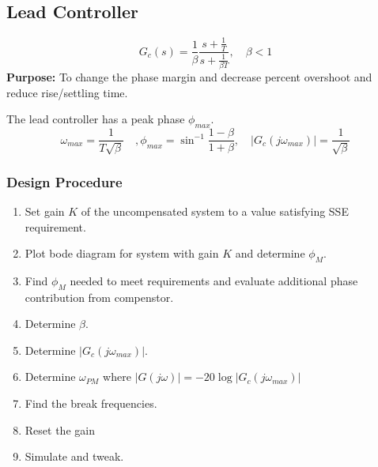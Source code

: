 \subsection*{Lead Controller}
\[
  G_c(s) = \frac{1}{\beta}\frac{s+\frac{1}{T}}{s+\frac{1}{\beta T}}, \quad \beta < 1
\]
\textbf{Purpose:} To change the phase margin and decrease percent overshoot and reduce rise/settling time.

The lead controller has a peak phase $\phi_{max}$.
\[
  \omega_{max} = \frac{1}{T\sqrt{\beta}}\quad, \phi_{max} = \sin^{-1}\frac{1-\beta}{1+\beta}, \quad |G_c(j\omega_{max})| = \frac{1}{\sqrt{\beta}}
\]
\subsubsection*{Design Procedure}
\begin{enumerate}
  \item Set gain $K$ of the uncompensated system to a value satisfying SSE requirement.
  \item Plot bode diagram for system with gain $K$ and determine $\phi_M$.
  \item Find $\phi_{M}$ needed to meet requirements and evaluate additional phase contribution from compenstor.
  \item Determine $\beta$.
  \item Determine $|G_c(j\omega_{max})|$.
  \item Determine $\omega_{PM}$ where $|G(j\omega)| = -20\log|G_c(j\omega_{max})|$
  \item Find the break frequencies.
  \item Reset the gain
  \item Simulate and tweak.
\end{enumerate}

